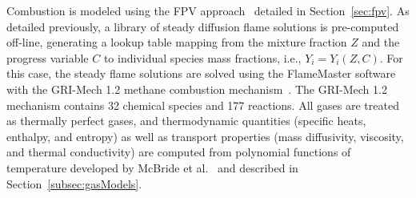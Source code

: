 Combustion is modeled using the FPV approach~\cite{Pierce2001} detailed in Section~\ref{sec:fpv}. As detailed previously, a library of steady diffusion flame solutions is pre-computed off-line, generating a lookup table mapping from the mixture fraction $Z$ and the progress variable $C$ to individual species mass fractions, i.e., $Y_i = Y_i(Z,C)$. For this case, the steady flame solutions are solved using the FlameMaster software~\cite{flamemaster} with the GRI-Mech 1.2 methane combustion mechanism~\cite{griMech}. The GRI-Mech 1.2 mechanism contains 32 chemical species and 177 reactions. All gases are treated as thermally perfect gases, and thermodynamic quantities (specific heats, enthalpy, and entropy) as well as transport properties (mass diffusivity, viscosity, and thermal conductivity) are computed from polynomial functions of temperature developed by McBride et al.~\cite{McBride1993} and described in Section~\ref{subsec:gasModels}.


